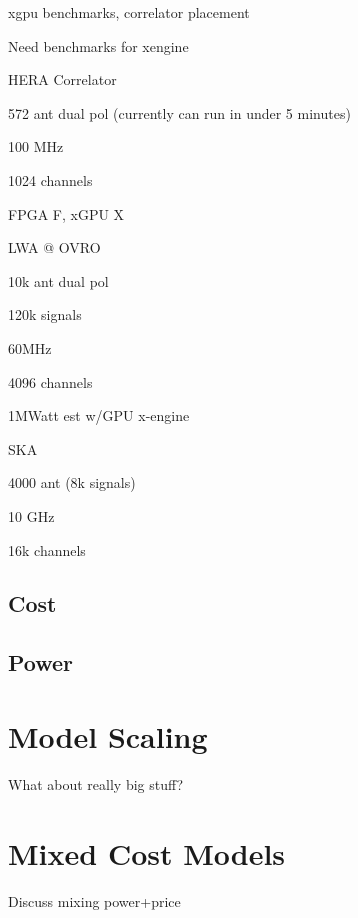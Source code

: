 xgpu benchmarks, correlator placement

Need benchmarks for xengine

HERA Correlator

572 ant dual pol (currently can run in under 5 minutes)

100 MHz

1024 channels

FPGA F, xGPU X

LWA @ OVRO

10k ant dual pol

120k signals

60MHz

4096 channels

1MWatt est w/GPU x-engine

SKA

4000 ant (8k signals)

10 GHz

16k channels




\subsection{Cost}
\subsection{Power}

\section{Model Scaling}
What about really big stuff?

\section{Mixed Cost Models}
Discuss mixing power+price
